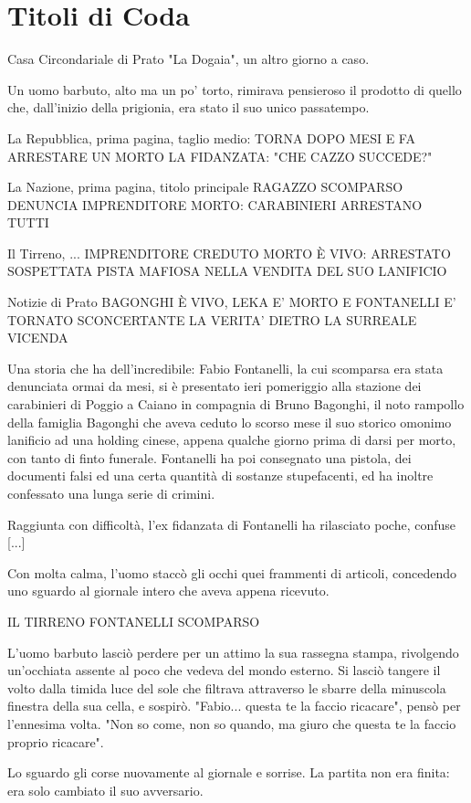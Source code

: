 \chapter{Titoli di Coda}

Casa Circondariale di Prato "La Dogaia", un altro giorno a caso.

Un uomo barbuto, alto ma un po' torto, rimirava pensieroso il prodotto di quello che, dall'inizio della prigionia, era stato il suo unico passatempo.

La Repubblica, prima pagina, taglio medio:
TORNA DOPO MESI E FA ARRESTARE UN MORTO
LA FIDANZATA: "CHE CAZZO SUCCEDE?"

La Nazione, prima pagina, titolo principale
RAGAZZO SCOMPARSO DENUNCIA IMPRENDITORE MORTO: CARABINIERI ARRESTANO TUTTI

Il Tirreno, ...
IMPRENDITORE CREDUTO MORTO È VIVO: ARRESTATO
SOSPETTATA PISTA MAFIOSA NELLA VENDITA DEL SUO LANIFICIO

Notizie di Prato
BAGONGHI È VIVO, LEKA E' MORTO E FONTANELLI E' TORNATO
SCONCERTANTE LA VERITA' DIETRO LA SURREALE VICENDA

Una storia che ha dell'incredibile: Fabio Fontanelli, la cui scomparsa era stata denunciata ormai da mesi, si è presentato ieri pomeriggio alla stazione dei carabinieri di Poggio a Caiano in compagnia di Bruno Bagonghi, il noto rampollo della famiglia Bagonghi che aveva ceduto lo scorso mese il suo storico omonimo lanificio ad una holding cinese, appena qualche giorno prima di darsi per morto, con tanto di finto funerale. Fontanelli ha poi consegnato una pistola, dei documenti falsi ed una certa quantità di sostanze stupefacenti, ed ha inoltre confessato una lunga serie di crimini.

Raggiunta con difficoltà, l'ex fidanzata di Fontanelli ha rilasciato poche, confuse [...]

Con molta calma, l'uomo staccò gli occhi quei frammenti di articoli, concedendo uno sguardo al giornale intero che aveva appena ricevuto.

IL TIRRENO
FONTANELLI SCOMPARSO

L'uomo barbuto lasciò perdere per un attimo la sua rassegna stampa, rivolgendo un'occhiata assente al poco che vedeva del mondo esterno. Si lasciò tangere il volto dalla timida luce del sole che filtrava attraverso le sbarre della minuscola finestra della sua cella, e sospirò. "Fabio... questa te la faccio ricacare", pensò per l'ennesima volta. "Non so come, non so quando, ma giuro che questa te la faccio proprio ricacare".

Lo sguardo gli corse nuovamente al giornale e sorrise. La partita non era finita: era solo cambiato il suo avversario.
